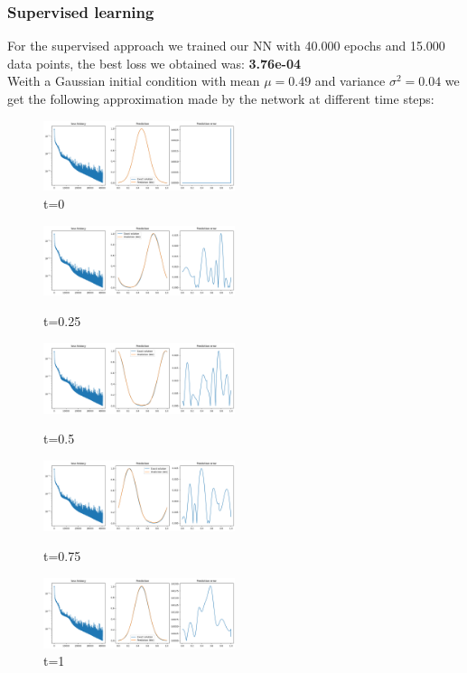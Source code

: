 \documentclass{article}
\begin{document}
\subsubsection{Supervised learning}
For the supervised approach we trained our NN with 40.000 epochs and 15.000 data points, the best loss we obtained was: \textbf{3.76e-04} \\
Weith a Gaussian initial condition with mean $\mu = 0.49$ and variance $\sigma^2 = 0.04$ we get the following approximation made by the network at different time steps:\\

\begin{figure}[!h]
    \centering
    \includegraphics[width=0.5\textwidth]{images/data1.png}
    \caption{t=0}
\end{figure}

\begin{figure}[!h]
    \centering
    \includegraphics[width=0.5\textwidth]{images/data2.png}
    \caption{t=0.25}
    \includegraphics[width=0.5\textwidth]{images/data3.png}
    \caption{t=0.5}
    \includegraphics[width=0.5\textwidth]{images/data4.png}
    \caption{t=0.75}
    \includegraphics[width=0.5\textwidth]{images/data5.png}
    \caption{t=1}
\end{figure} 
\end{document}
